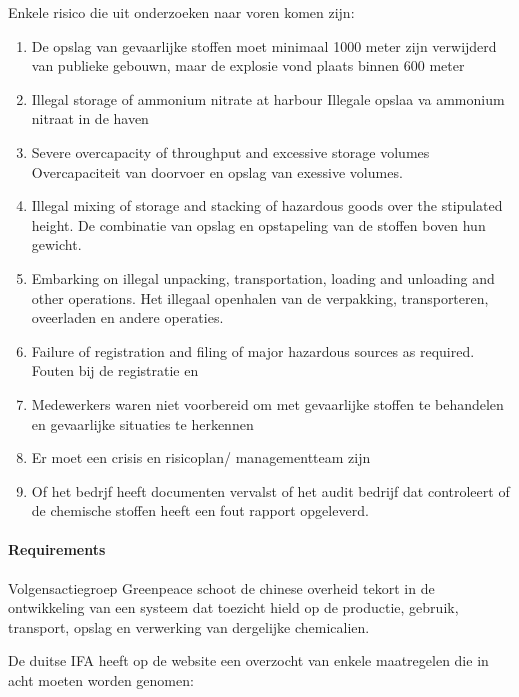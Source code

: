 \documentclass{article}
\begin{document}
Enkele risico die uit onderzoeken naar voren komen zijn:
\begin{enumerate}
\item De opslag van gevaarlijke stoffen moet minimaal 1000 meter zijn verwijderd van publieke gebouwn, maar de explosie vond plaats binnen 600 meter
\item Illegal storage of ammonium nitrate at harbour Illegale opslaa va ammonium nitraat in de haven
\item Severe overcapacity of throughput and excessive storage volumes Overcapaciteit van doorvoer en opslag van exessive volumes.
\item Illegal mixing of storage and stacking of hazardous goods over the stipulated height. De combinatie van opslag en opstapeling van de stoffen boven hun gewicht.
\item Embarking on illegal unpacking, transportation, loading and unloading and other operations. Het illegaal openhalen van de verpakking, transporteren, oveerladen en andere operaties.
\item Failure of registration and filing of major hazardous sources as required. Fouten bij de registratie en
\item Medewerkers waren niet voorbereid om met gevaarlijke stoffen te behandelen en gevaarlijke situaties te herkennen
\item Er moet een crisis en risicoplan/ managementteam zijn
\item Of het bedrjf heeft documenten vervalst of het audit bedrijf dat controleert of de chemische stoffen heeft een fout rapport opgeleverd.
\end{enumerate}
\paragraph{Requirements}
Volgensactiegroep Greenpeace schoot de chinese overheid tekort in  de ontwikkeling van een systeem dat toezicht hield op de productie, gebruik, transport, opslag en  verwerking van dergelijke chemicalien.

De duitse IFA heeft op de website een overzocht van enkele maatregelen die in acht moeten worden genomen:
\end{document}
